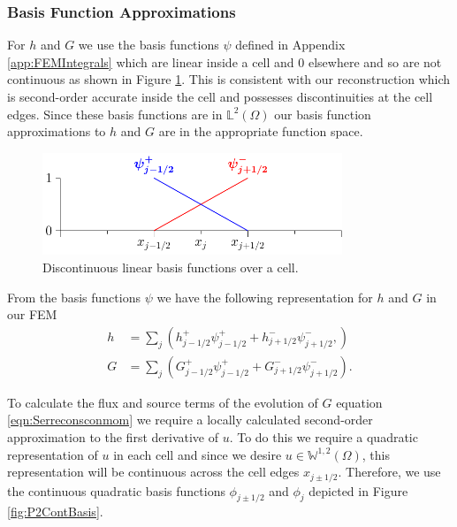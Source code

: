 \subsubsection{Basis Function Approximations}
For $h$ and $G$ we use the basis functions $\psi$ defined in Appendix \ref{app:FEMIntegrals} which are linear inside a cell and $0$ elsewhere and so are not continuous as shown in Figure \ref{fig:P1DiscBasis}. This is consistent with our reconstruction which is second-order accurate inside the cell and possesses discontinuities at the cell edges. Since these basis functions are in $\mathbb{L}^2(\Omega)$ our basis function approximations to $h$ and $G$ are in the appropriate function space.

\begin{figure}
	\centering
	\includegraphics[width=0.8\textwidth]{./chp3/figures/P1.pdf}
	\caption{Discontinuous linear basis functions over a cell.}
	\label{fig:P1DiscBasis}
\end{figure}
From the basis functions $\psi$ we have the following representation for $h$ and $G$ in our FEM
\begin{subequations}
\begin{align}
\label{eqn:FEapproxtoh}
h &= \sum_j \left( h^+_{j-1/2}\psi^+_{j-1/2}  + h^-_{j+1/2}\psi^-_{j+1/2}, \right) \\
G &= \sum_j\left( G^+_{j-1/2}\psi^+_{j-1/2}  + G^-_{j+1/2}\psi^-_{j+1/2}\right).
\label{eqn:FEapproxtoG}
\end{align}
\label{eqn:FEapproxtohG}
\end{subequations}

To calculate the flux and source terms of the evolution of $G$ equation \eqref{eqn:Serreconsconmom} we require a locally  calculated second-order approximation to the first derivative of $u$. To do this we require a quadratic representation of $u$ in each cell and since we desire $u\in\mathbb{W}^{1,2}(\Omega)$, this representation will be continuous across the cell edges $x_{j \pm 1/2}$. Therefore, we use the continuous quadratic basis functions $\phi_{j\pm1/2} $ and $\phi_{j} $ depicted in Figure \ref{fig:P2ContBasis}.

